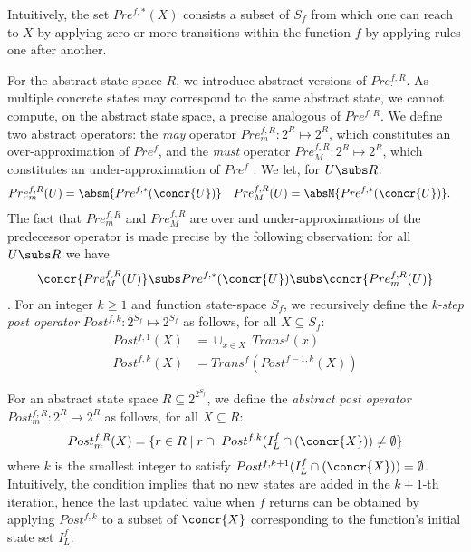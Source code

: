 \documentclass{llncs}
\begin{document}
Intuitively, the set $Pre^{f,*}(X)$ consists a subset of $S_f$ from which one can reach to $X$ by applying zero or more transitions within the function $f$ by applying rules one after another.

For the abstract state space $R$, we introduce abstract versions of $Pre^{f,R}_\cdot$. 
As multiple concrete states may correspond to the same
abstract state, we cannot compute, on the abstract state space, 
a precise analogous of $Pre^{f,R}_\cdot$. 
We define two abstract operators: the {\em may\/} operator $Pre^{f,R}_m: 2^R \mapsto 2^R$, 
which constitutes an over-approximation of $Pre^f$, 
and the {\em must\/} operator $Pre^{f,R}_M: 2^R \mapsto 2^R$, 
which constitutes an under-approximation of $Pre^f$ \cite{dAGJ-lics04}. 
We let, for $U \subs R$: 
\begin{align}
  \label{eq-abstract-cpre}
  Pre^{f,R}_m(U)  & = \absm{Pre^{f,*} (\concr{U})} &
  Pre^{f,R}_M(U) & = \absM{Pre^{f,*} (\concr{U})} . 
\end{align}
The fact that $Pre^{f,R}_m$ and $Pre^{f,R}_M$ are over and
under-approximations of the predecessor operator is made
precise by the following observation: for all $U \subs R$ we have
\begin{align}
  \label{eq-comp-pre}
  \concr{Pre^{f,R}_M (U)} \subs Pre^{f,*} (\concr{U}) \subs \concr{Pre^{f,R}_m(U)}
\end{align}.
For an integer $k \geq 1$ and function state-space $S_f$, 
we recursively define the {\em k-step  post operator\/}
$Post^{f,k} : 2^{S_f} \mapsto 2^{S_f}$ as follows, for all $X \subseteq S_f$: 
\begin{align}\label{post-onestep}
  Post^{f,1} (X) & =  \cup_{x \in X}\ Trans^f (x)\\
  Post^{f,k} (X)  & =  Trans^f (Post^{f-1,k}(X))
\end{align}


For an abstract state space $R \subseteq 2^{2^{S_f}}$, we define the {\em abstract post operator\/}
$Post^{f,R}_m : 2^R \mapsto 2^R$ as follows, for all $X \subseteq R$: 
\begin{equation}\label{post-global}
  Post^{f,R}_m (X) =  \{ r \in R \mid r \cap\ Post^{f,k} (I^f_L \cap (\concr{X})) \neq \emptyset\}
\end{equation}
where $k$ is the smallest integer to satisfy $Post^{f,k+1}(I^f_L \cap (\concr{X})) = \emptyset$.
Intuitively, the condition implies that no new states are added in the $k+1$-th iteration, hence 
the last updated value when $f$ returns can be obtained by applying $Post^{f,k}$ to 
a subset of $\concr{X}$ corresponding to the function's initial state set $I^f_L$.
\end{document}
